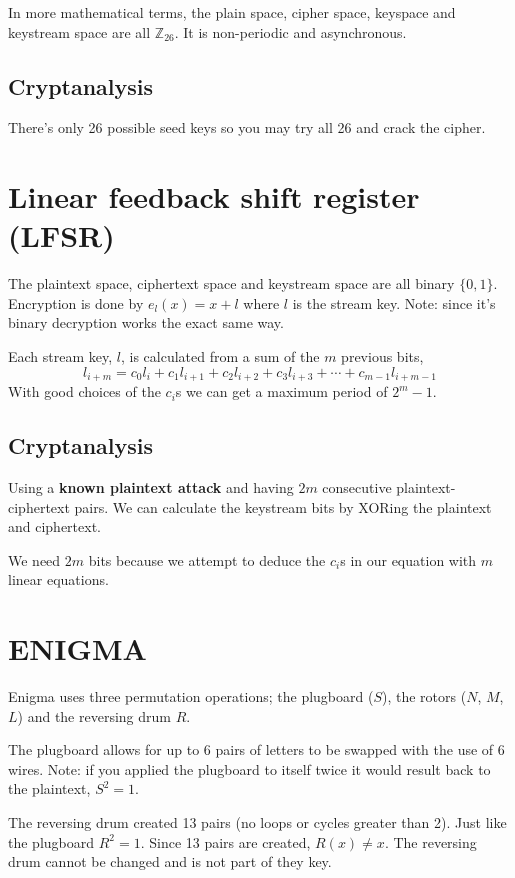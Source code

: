 \documentclass{report}
\begin{document}
In more mathematical terms, the plain space, cipher space, keyspace and
keystream space are all $\mathbb{Z}_{26}$. It is non-periodic and asynchronous.

\subsection{Cryptanalysis}
There's only 26 possible seed keys so you may try all 26 and crack the cipher.

\section{Linear feedback shift register (LFSR)}
The plaintext space, ciphertext space and keystream space are all binary
$\{0,1\}$. Encryption is done by $e_l(x) = x + l$ where $l$ is the stream key.
Note: since it's binary decryption works the exact same way.

Each stream key, $l$, is calculated from a sum of the $m$ previous bits,
\[
l_{i+m} = c_0 l_i + c_1 l_{i+1} + c_2 l_{i+2} + c_3 l_{i+3}
+ \cdots + c_{m-1} l_{i+m-1}
\]
With good choices of the $c_i$s we can get a maximum period of $2^m - 1$.

\subsection{Cryptanalysis}
Using a \textbf{known plaintext attack} and having $2m$ consecutive
plaintext-ciphertext pairs. We can calculate the keystream bits by
XORing the plaintext and ciphertext.

We need $2m$ bits because we attempt to deduce the $c_i$s in our equation
with $m$ linear equations.

\section{ENIGMA}
Enigma uses three permutation operations; the plugboard ($S$),
the rotors ($N$, $M$, $L$) and the reversing drum $R$.

The plugboard allows for up to 6 pairs of letters to be swapped with the use
of 6 wires. Note: if you applied the plugboard to itself twice it
would result back to the plaintext, $S^2 = 1$.

The reversing drum created 13 pairs (no loops or cycles greater than 2). Just
like the plugboard $R^2 = 1$. Since 13 pairs are created, $R(x) \neq x$. The
reversing drum cannot be changed and is not part of they key.
\end{document}
